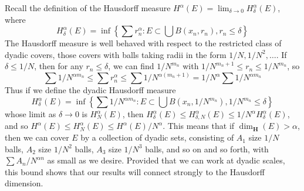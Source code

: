 \documentclass{report}
\theoremstyle{plain}
\theoremstyle{plain}
\begin{document}
Recall the definition of the Hausdorff measure $H^\alpha(E) = \lim_{\delta \to 0} H^\alpha_\delta(E)$, where
%
\[ H^\alpha_\delta(E) = \inf \left\{ \sum r_n^\alpha : E \subset \bigcup B(x_n,r_n), r_n \leq \delta \right\} \]
%
The Hausdorff measure is well behaved with respect to the restricted class of dyadic covers, those covers with balls taking radii in the form $1/N, 1/N^2, \dots$. If $\delta \leq 1/N$, then for any $r_n \leq \delta$, we can find $1/N^{m_n}$ with $1/N^{m_n + 1} \leq r_n \leq 1/N^{m_n}$, so
%
\[ \sum 1/N^{\alpha m_n} \leq \sum r_n^\alpha \leq \sum 1/N^{\alpha (m_n + 1)} = 1/N^\alpha \sum 1/N^{\alpha m_n} \]
%
Thus if we define the dyadic Hausdorff measure
%
\[ H^\alpha_\delta(E) = \inf \left\{ \sum 1/N^{\alpha m_n} : E \subset \bigcup B(x_n,1/N^{m_n}), 1/N^{m_n} \leq \delta \right\} \]
%
whose limit as $\delta \to 0$ is $H^\alpha_N(E)$, then $H^\alpha_\delta(E) \leq H^\alpha_{\delta,N}(E) \leq 1/N^\alpha H^\alpha_\delta(E)$, and so $H^\alpha(E) \leq H^\alpha_N(E) \leq H^\alpha(E)/N^\alpha$. This means that if $\dim_{\mathbf{H}}(E) > \alpha$, then we can cover $E$ by a collection of dyadic sets, consisting of $A_1$ size $1/N$ balls, $A_2$ size $1/N^2$ balls, $A_3$ size $1/N^3$ balls, and so on and so forth, with $\sum A_n/N^{\alpha n}$ as small as we desire. Provided that we can work at dyadic scales, this bound shows that our results will connect strongly to the Hausdorff dimension.
\end{document}
